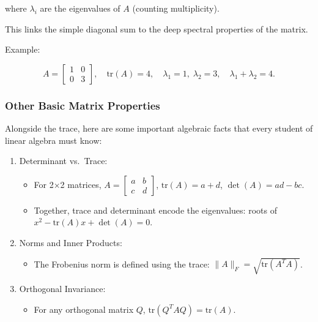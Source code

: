 \documentclass[
  letterpaper,
  DIV=11,
  numbers=noendperiod]{scrreprt}
\providecommand{\tightlist}{%
  \setlength{\itemsep}{0pt}\setlength{\parskip}{0pt}}
\begin{document}
where \(\lambda_i\) are the eigenvalues of \(A\) (counting
multiplicity).

This links the simple diagonal sum to the deep spectral properties of
the matrix.

Example:

\[
A = \begin{bmatrix} 1 & 0 \\ 0 & 3 \end{bmatrix}, \quad 
\text{tr}(A) = 4, \quad 
\lambda_1 = 1, \; \lambda_2 = 3, \quad \lambda_1 + \lambda_2 = 4.
\]

\subsubsection{Other Basic Matrix
Properties}\label{other-basic-matrix-properties}

Alongside the trace, here are some important algebraic facts that every
student of linear algebra must know:

\begin{enumerate}
\def\labelenumi{\arabic{enumi}.}
\item
  Determinant vs.~Trace:

  \begin{itemize}
  \tightlist
  \item
    For 2×2 matrices,
    \(A = \begin{bmatrix} a & b \\ c & d \end{bmatrix}\),
    \(\text{tr}(A) = a + d\), \(\det(A) = ad - bc\).
  \item
    Together, trace and determinant encode the eigenvalues: roots of
    \(x^2 - \text{tr}(A)x + \det(A) = 0\).
  \end{itemize}
\item
  Norms and Inner Products:

  \begin{itemize}
  \tightlist
  \item
    The Frobenius norm is defined using the trace:
    \(\|A\|_F = \sqrt{\text{tr}(A^TA)}\).
  \end{itemize}
\item
  Orthogonal Invariance:

  \begin{itemize}
  \tightlist
  \item
    For any orthogonal matrix \(Q\),
    \(\text{tr}(Q^TAQ) = \text{tr}(A)\).
  \end{itemize}
\end{enumerate}
\end{document}
